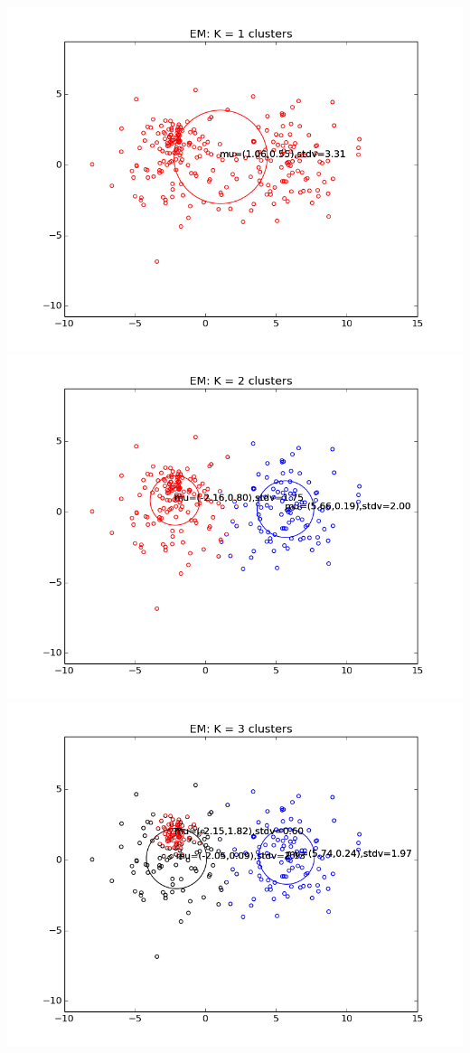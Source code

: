 \documentclass{article}
\begin{document}
    \begin{center}
      \includegraphics[scale=0.4]{sec1d_k1.png}
      \includegraphics[scale=0.4]{sec1d_k2.png} 
      \includegraphics[scale=0.4]{sec1d_k3.png}  

\end{center}
\end{document}
